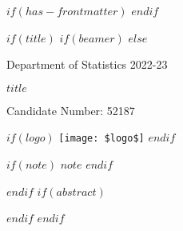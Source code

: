 $if(has-frontmatter)$
\frontmatter
$endif$



$if(title)$
$if(beamer)$
\frame{\titlepage}
$else$
\begin{titlepage}
\centering
\vspace*{3cm}

{\large Department of Statistics 2022-23\\}
\vspace{1cm}

{\Large\bfseries $title$}
\vspace{1cm}

{\large Candidate Number: 52187\\}
\vspace{9cm}
\begin{center}

$if(logo)$
\texttt{[image: \$logo\$]}
$endif$

\end{center}
\vspace{1cm}

$if(note)$
{\small $note$}
$endif$

\vspace{3cm}
\end{titlepage}


$endif$
$if(abstract)$
\begin{abstract}
$abstract$
\end{abstract}
$endif$
$endif$